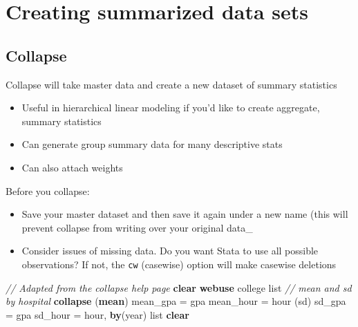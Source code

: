 \documentclass[
]{book}
\newenvironment{Shaded}{\begin{snugshade}}{\end{snugshade}}
\newcommand{\CommentTok}[1]{\textcolor[rgb]{0.56,0.35,0.01}{\textit{#1}}}
\newcommand{\FunctionTok}[1]{\textcolor[rgb]{0.00,0.00,0.00}{#1}}
\newcommand{\KeywordTok}[1]{\textcolor[rgb]{0.13,0.29,0.53}{\textbf{#1}}}
\newcommand{\NormalTok}[1]{#1}
\newcommand{\OtherTok}[1]{\textcolor[rgb]{0.56,0.35,0.01}{#1}}
\providecommand{\tightlist}{%
  \setlength{\itemsep}{0pt}\setlength{\parskip}{0pt}}
\begin{document}
\hypertarget{creating-summarized-data-sets}{%
\section{Creating summarized data sets}\label{creating-summarized-data-sets}}

\hypertarget{collapse}{%
\subsection{Collapse}\label{collapse}}

Collapse will take master data and create a new dataset of summary statistics

\begin{itemize}
\tightlist
\item
  Useful in hierarchical linear modeling if you'd like to create aggregate, summary statistics
\item
  Can generate group summary data for many descriptive stats
\item
  Can also attach weights
\end{itemize}

Before you collapse:

\begin{itemize}
\tightlist
\item
  Save your master dataset and then save it again under a new name (this will prevent collapse from writing over your original data\_
\item
  Consider issues of missing data. Do you want Stata to use all possible observations? If not, the \texttt{cw} (casewise) option will make casewise deletions
\end{itemize}

\begin{Shaded}
\begin{Highlighting}[]
  \CommentTok{// Adapted from the collapse help page}
  \KeywordTok{clear}
  \KeywordTok{webuse}\NormalTok{ college}
  \OtherTok{list}
  \CommentTok{// mean and sd by hospital}
  \KeywordTok{collapse}\NormalTok{ (}\KeywordTok{mean}\NormalTok{) mean_gpa = gpa mean_hour = hour (}\FunctionTok{sd}\NormalTok{) sd_gpa = gpa sd_hour = hour, }\KeywordTok{by}\NormalTok{(}\FunctionTok{year}\NormalTok{)}
  \OtherTok{list}
  \KeywordTok{clear}
\end{Highlighting}
\end{Shaded}
\end{document}
